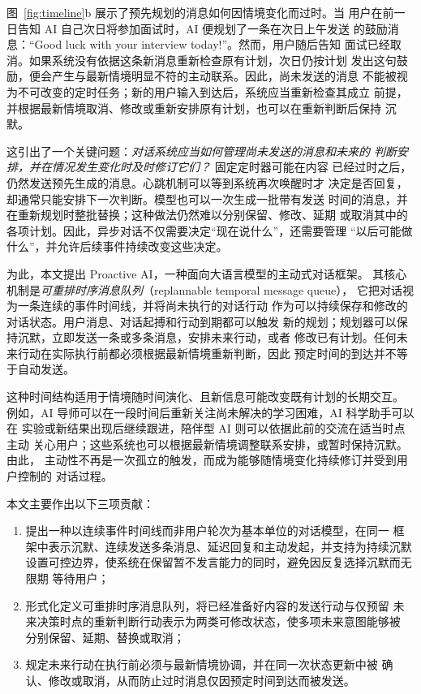 \documentclass[manuscript,nonacm]{acmart}
\begin{document}
图~\ref{fig:timeline}b 展示了预先规划的消息如何因情境变化而过时。当
用户在前一日告知 AI 自己次日将参加面试时，AI 便规划了一条在次日上午发送
的鼓励消息：“Good luck with your interview today!”。然而，用户随后告知
面试已经取消。如果系统没有依据这条新消息重新检查原有计划，次日仍按计划
发出这句鼓励，便会产生与最新情境明显不符的主动联系。因此，尚未发送的消息
不能被视为不可改变的定时任务；新的用户输入到达后，系统应当重新检查其成立
前提，并根据最新情境取消、修改或重新安排原有计划，也可以在重新判断后保持
沉默。

这引出了一个关键问题：\emph{对话系统应当如何管理尚未发送的消息和未来的
判断安排，并在情况发生变化时及时修订它们？} 固定定时器可能在内容
已经过时之后，仍然发送预先生成的消息。心跳机制可以等到系统再次唤醒时才
决定是否回复，却通常只能安排下一次判断。模型也可以一次生成一批带有发送
时间的消息，并在重新规划时整批替换；这种做法仍然难以分别保留、修改、延期
或取消其中的各项计划。因此，异步对话不仅需要决定“现在说什么”，还需要管理
“以后可能做什么”，并允许后续事件持续改变这些决定。

为此，本文提出 Proactive AI，一种面向大语言模型的主动式对话框架。
其核心机制是\emph{可重排时序消息队列}（replannable temporal message queue），
它把对话视为一条连续的事件时间线，并将尚未执行的对话行动
作为可以持续保存和修改的对话状态。用户消息、对话起搏和行动到期都可以触发
新的规划；规划器可以保持沉默，立即发送一条或多条消息，安排未来行动，或者
修改已有计划。任何未来行动在实际执行前都必须根据最新情境重新判断，因此
预定时间的到达并不等于自动发送。

这种时间结构适用于情境随时间演化、且新信息可能改变既有计划的长期交互。
例如，AI 导师可以在一段时间后重新关注尚未解决的学习困难，AI 科学助手可以在
实验或新结果出现后继续跟进，陪伴型 AI 则可以依据此前的交流在适当时点主动
关心用户；这些系统也可以根据最新情境调整联系安排，或暂时保持沉默。由此，
主动性不再是一次孤立的触发，而成为能够随情境变化持续修订并受到用户控制的
对话过程。

本文主要作出以下三项贡献：

\begin{enumerate}
  \item 提出一种以连续事件时间线而非用户轮次为基本单位的对话模型，在同一
  框架中表示沉默、连续发送多条消息、延迟回复和主动发起，并支持为持续沉默
  设置可控边界，使系统在保留暂不发言能力的同时，避免因反复选择沉默而无限期
  等待用户；
  \item 形式化定义可重排时序消息队列，将已经准备好内容的发送行动与仅预留
  未来决策时点的重新判断行动表示为两类可修改状态，使多项未来意图能够被
  分别保留、延期、替换或取消；
  \item 规定未来行动在执行前必须与最新情境协调，并在同一次状态更新中被
  确认、修改或取消，从而防止过时消息仅因预定时间到达而被发送。
\end{enumerate}
\end{document}
